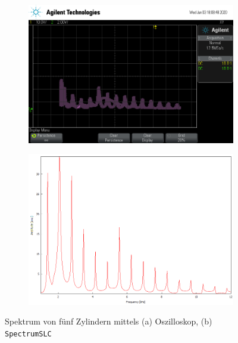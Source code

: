 \begin{figure}
    \begin{subfigure}[c]{width=0.45\textwidth}
        \includegraphics[width=\textwidth]{figure/5Zylinder.png}
    \end{subfigure}
    \begin{subfigure}[c]{width=0.45\textwidth}
        \includegraphics[width=\textwidth]{figure/5_Zylinder.png}
    \end{subfigure}
    \caption{Spektrum von fünf Zylindern mittels (a) Oszilloskop, (b) \texttt{SpectrumSLC}}
\end{figure}
